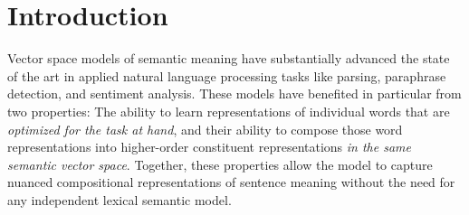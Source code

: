 \documentclass[10pt,letterpaper]{article}
\begin{document}








\section{Introduction}

Vector space models of semantic meaning have  substantially advanced the state of the art in applied natural language processing tasks like parsing, paraphrase detection, and sentiment analysis. These models have benefited in particular from two properties: The ability to learn representations of individual words that are \textit{optimized for the task at hand}, and their ability to compose those word representations into higher-order constituent representations \textit{in the same semantic vector space}. Together, these properties allow the model to capture nuanced compositional representations of sentence meaning without the need for any independent lexical semantic model.
\end{document}
